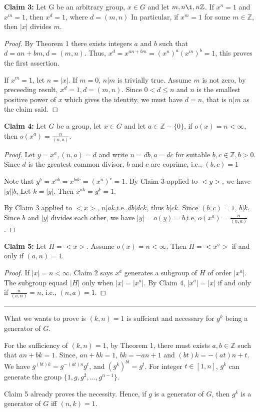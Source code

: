 \documentclass[12pt]{article}
\begin{document}
\noindent \textbf{Claim 3: } Let G be an arbitrary group, $x\in G$ and let $m,n\i,n\mathbb{Z}$. If $x^n = 1$ and $x^m = 1$, then $x^d = 1$, where $d=(m,n)$ In particular, if $x^m = 1$ for some $m\in\mathbb{Z}$, then $|x|$ divides $m$.
\begin{proof}
By Theorem 1 there exists integers $a$ and $b$ such that $d=an+bm,d=(m,n)$. Thus, $x^d=x^{an+bm}=(x^n)^a(x^m)^b=1$, this proves the first assertion.

If $x^m=1$, let $n=|x|$. If $m=0$, $n|m$ is trivially true. Assume $m$ is not zero, by preceeding result, $x^d=1,d=(m,n)$. Since $0< d\le n$ and $n$ is the smallest positive power of $x$ which gives the identity, we must have $d=n$, that is $n|m$ as the claim said.
\end{proof}
\noindent \textbf{Claim 4:} Let $G$ be a group, let $x\in G$ and let $a\in\mathbb{Z}-\{0\}$, if $o(x)=n<\infty$, then $o(x^a)=\frac{n}{(n,a)}$. 
\begin{proof}
Let $y=x^a,(n,a)=d$ and write $n=db,a=dc$ for suitable $b,c\in\mathbb{Z},b>0$. Since $d$ is the greatest common divisor, $b$ and $c$ are coprime, i.e., $(b,c)=1$

Note that $y^b=x^{ab}=x^{bdc}=(x^n)^c=1$. By Claim 3 applied to $<y>$, we have $|y||b$, Let $k=|y|$. Then $x^{ak}=y^k=1$. 

By Claim 3 applied to $<x>$, $n|ak$,i.e.,$db|dck$, thus $b|ck$. Since $(b,c)=1$, $b|k$. Since $b$ and $|y|$ divides each other, we have $|y|=o(y)=b$,i.e, $o(x^a)=\frac{n}{(n,a)}$.
\end{proof}
\noindent \textbf{Claim 5:} Let $H=<x>$. Assume $o(x)=n<\infty$. Then $H=<x^a>$ if and only if $(a,n)=1$.
\begin{proof}
If $|x|=n<\infty$. Claim 2 says $x^a$ generates a subgroup of $H$ of order $|x^a|$. The subgroup equasl $|H|$ only when $|x|=|x^a|$. By Claim 4, $|x^a|=|x|$ if and only if $\frac{n}{(a,n)}=n$, i.e., $(n,a)=1$.
\end{proof}
\noindent\rule{\textwidth}{1pt}

What we wants to prove is $(k,n)=1$ is suffcient and necessary for $g^k$ being a generator of $G$.

For the sufficiency of $(k,n)=1$, by Theorem 1, there must exists $a,b\in\mathbb{Z}$ such that $an+bk=1$. Since, $an+bk=1$, $bk=-an+1$ and $(bt)k=-(at)n+t$. We have $g^{(bt)k}=g^{-(at)n}g^t$, and $(g^k)^{bt}=g^t$. For integer $t\in[1,n]$, $g^k$ can generate the group $\{1,g,g^2,\dots,g^{n-1}\}$.

Claim 5 already proves the necessity. Hence, if $g$ is a generator of $G$, then $g^k$ is a generator of $G$ iff $(n,k)=1$.
\end{document}
